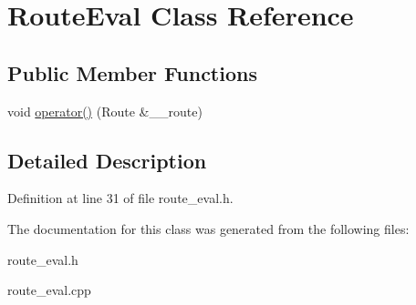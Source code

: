 \hypertarget{classRouteEval}{
\section{Route\-Eval Class Reference}
\label{classRouteEval}
}
\subsection*{Public Member Functions}
\begin{CompactItemize}
\item 
\hypertarget{classRouteEval_e10bbe6f792e6f44405953de4f703901}{
void \hyperlink{classRouteEval_e10bbe6f792e6f44405953de4f703901}{operator()} (Route \&\_\-\_\-route)}
\label{classRouteEval_e10bbe6f792e6f44405953de4f703901}

\end{CompactItemize}


\subsection{Detailed Description}




Definition at line 31 of file route\_\-eval.h.

The documentation for this class was generated from the following files:\begin{CompactItemize}
\item 
route\_\-eval.h\item 
route\_\-eval.cpp\end{CompactItemize}
